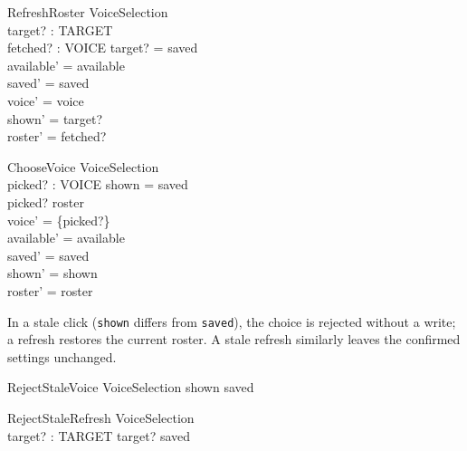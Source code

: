 \documentclass[a4paper,10pt,fleqn]{article}
\begin{document}
\begin{schema}{RefreshRoster}
  \Delta VoiceSelection \\
  target? : TARGET \\
  fetched? : \power VOICE
\where
  target? = saved \\
  available' = available \\
  saved' = saved \\
  voice' = voice \\
  shown' = target? \\
  roster' = fetched?
\end{schema}

\begin{schema}{ChooseVoice}
  \Delta VoiceSelection \\
  picked? : VOICE
\where
  shown = saved \\
  picked? \in roster \\
  voice' = \{picked?\} \\
  available' = available \\
  saved' = saved \\
  shown' = shown \\
  roster' = roster
\end{schema}

In a stale click (\texttt{shown} differs from \texttt{saved}), the choice is rejected
without a write; a refresh restores the current roster. A stale refresh
similarly leaves the confirmed settings unchanged.

\begin{schema}{RejectStaleVoice}
  \Xi VoiceSelection
\where
  shown \neq saved
\end{schema}

\begin{schema}{RejectStaleRefresh}
  \Xi VoiceSelection \\
  target? : TARGET
\where
  target? \neq saved
\end{schema}
\end{document}
